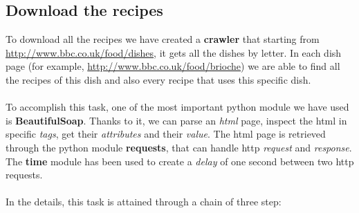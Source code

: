 \documentclass[oneside]{article}			%
\begin{document}
	\subsection{Download the recipes}
	To download all the recipes we have created a \textbf{crawler} that starting from \url{http://www.bbc.co.uk/food/dishes}, it gets all the dishes by letter. In each dish page (for example, \url{http://www.bbc.co.uk/food/brioche}) we are able to find all the recipes of this dish and also every recipe that uses this specific dish.
	\\\\
	To accomplish this task, one of the most important python module we have used  is \textbf{BeautifulSoap}. Thanks to it, we can parse an \textit{html} page, inspect the html in specific \textit{tags}, get their \textit{attributes} and their \textit{value}. The html page is retrieved through the python module \textbf{requests}, that can handle http \textit{request} and \textit{response}. The \textbf{time} module has been used to create a \textit{delay} of one second between two http requests.
	\\\\In the details, this task is attained through a chain of three step:
\end{document}
